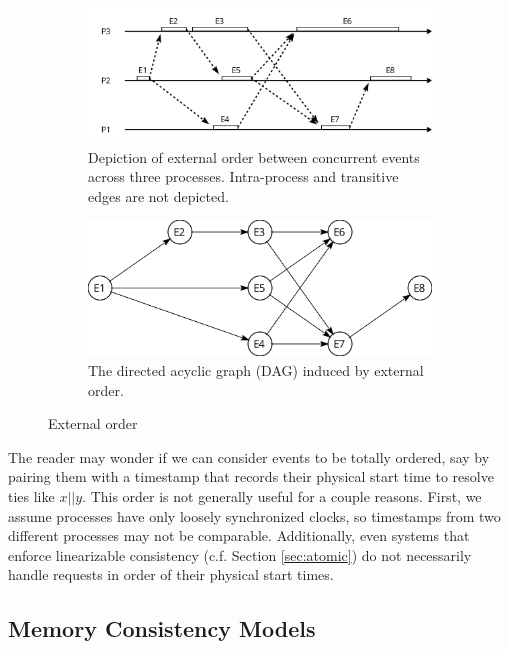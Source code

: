 \documentclass[]             %
{NASA}                       %
\theoremstyle{definition}
\begin{document}
\begin{figure}
     \begin{subfigure}[a]{1\textwidth}
         \center
         \includegraphics[scale=0.4]{images/externalorder.png}
         \caption{Depiction of external order between concurrent events across three processes. Intra-process and transitive edges are not depicted.}
         \label{fig:externalorderexec}
     \end{subfigure}
     \begin{subfigure}[b]{1\textwidth}
         \center
         \includegraphics[scale=0.25]{images/partialorder.png}
         \caption{The directed acyclic graph (DAG) induced by external order.}
         \label{fig:externalorderdag}
     \end{subfigure}
     \caption{External order}
     \label{fig:externalorder}
\end{figure}

The reader may wonder if we can consider events to be totally ordered,
say by pairing them with a timestamp that records their physical start
time to resolve ties like \(x || y\). This order is not generally useful
for a couple reasons. First, we assume processes have only loosely
synchronized clocks, so timestamps from two different processes may not
be comparable. Additionally, even systems that enforce linearizable
consistency (c.f. Section \ref{sec:atomic}) do not necessarily handle
requests in order of their physical start times.

\subsection{Memory Consistency Models}\label{memory-consistency-models}
\end{document}
